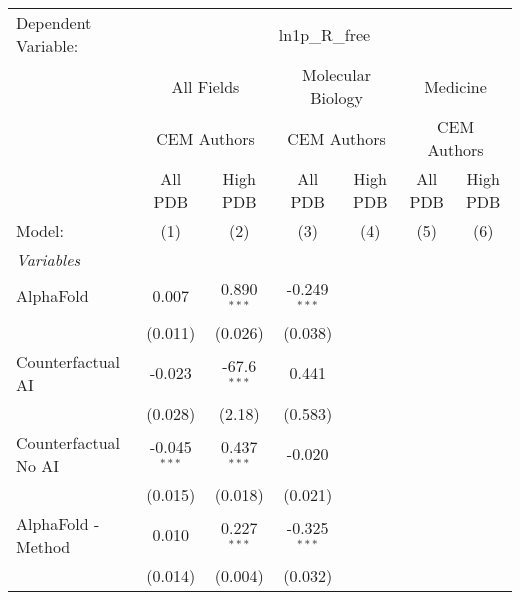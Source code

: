\begingroup
\centering
\begin{tabular}{lcccccc}
   \tabularnewline \midrule \midrule
   Dependent Variable: & \multicolumn{6}{c}{ln1p\_R\_free}\\
 & \multicolumn{2}{c}{All Fields} & \multicolumn{2}{c}{Molecular Biology} & \multicolumn{2}{c}{Medicine} \\
\cmidrule(lr){2-3} \cmidrule(lr){4-5} \cmidrule(lr){6-7}
 & \multicolumn{2}{c}{CEM Authors} & \multicolumn{2}{c}{CEM Authors} & \multicolumn{2}{c}{CEM Authors} \\
\cmidrule(lr){2-3} \cmidrule(lr){4-5} \cmidrule(lr){6-7}
 & \multicolumn{1}{c}{All PDB} & \multicolumn{1}{c}{High PDB} & \multicolumn{1}{c}{All PDB} & \multicolumn{1}{c}{High PDB} & \multicolumn{1}{c}{All PDB} & \multicolumn{1}{c}{High PDB} \\
\cmidrule(lr){2-2} \cmidrule(lr){3-3} \cmidrule(lr){4-4} \cmidrule(lr){5-5} \cmidrule(lr){6-6} \cmidrule(lr){7-7}
   Model:                                                     & (1)            & (2)           & (3)            & (4) & (5) & (6)\\  
   \midrule
   \emph{Variables}\\
   AlphaFold                                                  & 0.007          & 0.890$^{***}$ & -0.249$^{***}$ &     &     &   \\   
                                                              & (0.011)        & (0.026)       & (0.038)        &     &     &   \\   
   Counterfactual AI                                          & -0.023         & -67.6$^{***}$ & 0.441          &     &     &   \\   
                                                              & (0.028)        & (2.18)        & (0.583)        &     &     &   \\   
   Counterfactual No AI                                       & -0.045$^{***}$ & 0.437$^{***}$ & -0.020         &     &     &   \\   
                                                              & (0.015)        & (0.018)       & (0.021)        &     &     &   \\   
   AlphaFold - Method                                         & 0.010          & 0.227$^{***}$ & -0.325$^{***}$ &     &     &   \\   
                                                              & (0.014)        & (0.004)       & (0.032)        &     &     &   \\   

\end{tabular}

